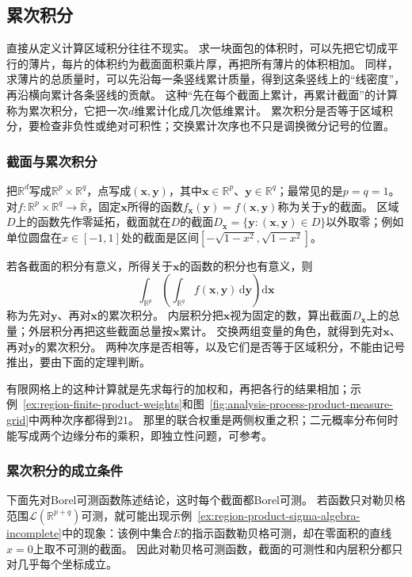 \subsection{累次积分}
\label{sec:multivariable-iterated-integrals}

直接从定义计算区域积分往往不现实。
求一块面包的体积时，可以先把它切成平行的薄片，每片的体积约为截面面积乘片厚，再把所有薄片的体积相加。
同样，求薄片的总质量时，可以先沿每一条竖线累计质量，得到这条竖线上的“线密度”，再沿横向累计各条竖线的贡献。
这种“先在每个截面上累计，再累计截面”的计算称为累次积分，它把一次$d$维累计化成几次低维累计。
累次积分是否等于区域积分，要检查非负性或绝对可积性；交换累计次序也不只是调换微分记号的位置。

\subsubsection{截面与累次积分}

把$\mathbb R^d$写成$\mathbb R^p\times\mathbb R^q$，点写成$(\bm x,\bm y)$，其中$\bm x\in\mathbb R^p$、$\bm y\in\mathbb R^q$；最常见的是$p=q=1$。
对$f:\mathbb R^p\times\mathbb R^q\to\overline{\mathbb R}$，固定$\bm x$所得的函数$f_{\bm x}(\bm y)=f(\bm x,\bm y)$称为关于$\bm y$的截面。
区域$D$上的函数先作零延拓，截面就在$D$的截面$D_{\bm x}=\{\bm y:(\bm x,\bm y)\in D\}$以外取零；例如单位圆盘在$x\in[-1,1]$处的截面是区间$[-\sqrt{1-x^2},\sqrt{1-x^2}]$。

若各截面的积分有意义，所得关于$\bm x$的函数的积分也有意义，则
\[
 \int_{\mathbb R^p}\left(\int_{\mathbb R^q}f(\bm x,\bm y)\,\mathrm d\bm y\right)\mathrm d\bm x
\]
称为先对$\bm y$、再对$\bm x$的累次积分。
内层积分把$\bm x$视为固定的数，算出截面$D_{\bm x}$上的总量；外层积分再把这些截面总量按$\bm x$累计。
交换两组变量的角色，就得到先对$\bm x$、再对$\bm y$的累次积分。
两种次序是否相等，以及它们是否等于区域积分，不能由记号推出，要由下面的定理判断。

有限网格上的这种计算就是先求每行的加权和，再把各行的结果相加；示例~\ref{ex:region-finite-product-weights}和图~\ref{fig:analysis-process-product-measure-grid}中两种次序都得到$21$。
那里的联合权重是两侧权重之积；二元概率分布何时能写成两个边缘分布的乘积，即独立性问题，可参考。

\subsubsection{累次积分的成立条件}

下面先对Borel可测函数陈述结论，这时每个截面都Borel可测。
若函数只对勒贝格范围$\mathcal L(\mathbb R^{p+q})$可测，就可能出现示例~\ref{ex:region-product-sigma-algebra-incomplete}中的现象：该例中集合$E$的指示函数勒贝格可测，却在零面积的直线$x=0$上取不可测的截面。
因此对勒贝格可测函数，截面的可测性和内层积分都只对几乎每个坐标成立。

